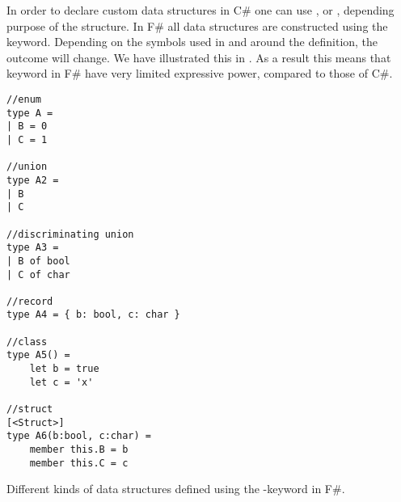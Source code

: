 

In order to declare custom data structures in C\# one can use ,  or , depending purpose of the structure. In F\# all data structures are constructed using the  keyword. Depending on the symbols used in and around the definition, the outcome will change. We have illustrated this in . As a result this means that  keyword in F\# have very limited expressive power, compared to those of C\#.

\begin{listing}
    \begin{verbatim}
//enum
type A =
| B = 0
| C = 1

//union
type A2 =
| B
| C

//discriminating union
type A3 =
| B of bool
| C of char

//record
type A4 = { b: bool, c: char }

//class
type A5() =
    let b = true
    let c = 'x'

//struct
[<Struct>]
type A6(b:bool, c:char) =
    member this.B = b
    member this.C = c
    \end{verbatim}
    \caption{Different kinds of data structures defined using the -keyword in F\#.}
    \label{lst:fsharp:type}
\end{listing}

